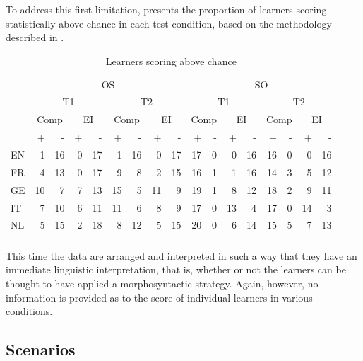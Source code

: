 To address this first limitation,  presents the proportion of learners scoring statistically above chance in each test condition, based on the methodology described in .

\begin{table}
    \begin{tabularx}{\textwidth}{Xrrrrrrrrrrrrrrrr}
    \lsptoprule
    & \multicolumn{8}{c}{ OS} & \multicolumn{8}{c}{ SO}\\
    & \multicolumn{4}{c}{ T1} & \multicolumn{4}{c}{ T2} & \multicolumn{4}{c}{ T1} & \multicolumn{4}{c}{ T2}\\
    & \multicolumn{2}{c}{ Comp} & \multicolumn{2}{c}{ EI} & \multicolumn{2}{c}{ Comp} & \multicolumn{2}{c}{ EI} & \multicolumn{2}{c}{ Comp} & \multicolumn{2}{c}{ EI} & \multicolumn{2}{c}{ Comp} & \multicolumn{2}{c}{ EI}\\
    \midrule
    & + & {}- & + & {}- & + & {}- & + & {}- & + & {}- & + & {}- & + & {}- & + & {}-\\
    EN & 1 & 16 & 0 & 17 & 1 & 16 & 0 & 17 & 17 & 0 & 0 & 16 & 16 & 0 & 0 & 16\\
    FR & 4 & 13 & 0 & 17 & 9 & 8 & 2 & 15 & 16 & 1 & 1 & 16 & 14 & 3 & 5 & 12\\
    GE & 10 & 7 & 7 & 13 & 15 & 5 & 11 & 9 & 19 & 1 & 8 & 12 & 18 & 2 & 9 & 11\\
    IT & 7 & 10 & 6 & 11 & 11 & 6 & 8 & 9 & 17 & 0 & 13 & 4 & 17 & 0 & 14 & 3\\
    NL & 5 & 15 & 2 & 18 & 8 & 12 & 5 & 15 & 20 & 0 & 6 & 14 & 15 & 5 & 7 & 13\\
    \lspbottomrule
    \end{tabularx}
    \caption{Learners scoring above chance}
    \label{tab:06:1}
\end{table}

This time the data are arranged and interpreted in such a way that they have an immediate linguistic interpretation, that is, whether or not the learners can be thought to have applied a morphosyntactic strategy. Again, however, no information is provided as to the score of individual learners in various conditions.

\subsection{Scenarios}\label{sec:06:2.2}

